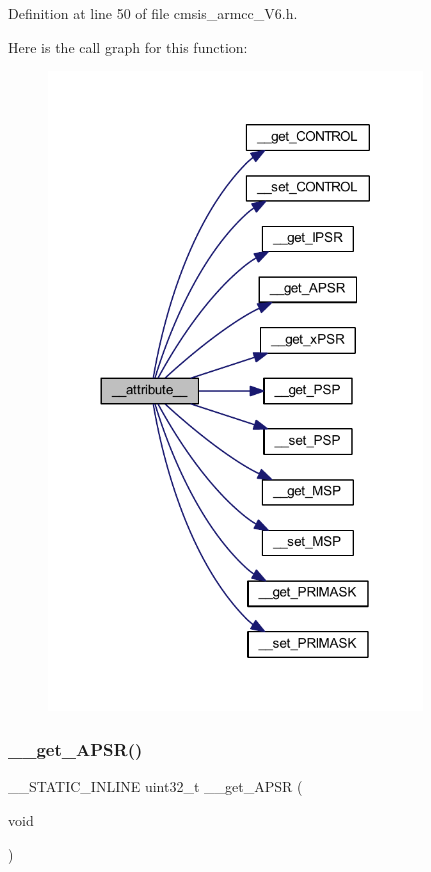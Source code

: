 Definition at line 50 of file cmsis\+\_\+armcc\+\_\+\+V6.\+h.

Here is the call graph for this function\+:
\nopagebreak
\begin{figure}[H]
\begin{center}
\leavevmode
\includegraphics[width=281pt]{group___c_m_s_i_s___core___reg_acc_functions_ga671b4fa3b3ab3dbc685a5473f3fc76aa_cgraph}
\end{center}
\end{figure}
\mbox{\label{group___c_m_s_i_s___core___reg_acc_functions_gaf082254959c727c663f2334021f1a98a}} 
\subsubsection{\texorpdfstring{\+\_\+\+\_\+get\+\_\+\+A\+P\+S\+R()}{\_\_get\_APSR()}}
{\footnotesize\ttfamily \+\_\+\+\_\+\+S\+T\+A\+T\+I\+C\+\_\+\+I\+N\+L\+I\+NE uint32\+\_\+t \+\_\+\+\_\+get\+\_\+\+A\+P\+SR (\begin{DoxyParamCaption}\item[{void}]{ }\end{DoxyParamCaption})}



